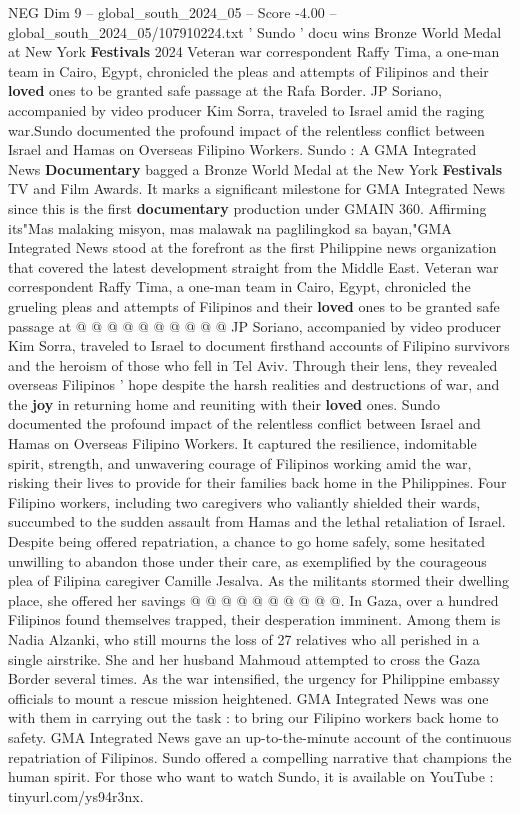 \begin{textsample}{NEG Dim 9 – global\_south\_2024\_05 – Score -4.00 – global\_south\_2024\_05/107910224.txt}  \label{ex:f9_neg_409}
' Sundo ' docu wins Bronze World Medal at New York \textbf{Festivals} 2024 Veteran war correspondent Raffy Tima, a one-man team in Cairo, Egypt, chronicled the pleas and attempts of Filipinos and their \textbf{loved} ones to be granted safe passage at the Rafa Border.
JP Soriano, accompanied by video producer Kim Sorra, traveled to Israel amid the raging war.Sundo documented the profound impact of the relentless conflict between Israel and Hamas on Overseas Filipino Workers.
Sundo : A GMA Integrated News \textbf{Documentary} bagged a Bronze World Medal at the New York \textbf{Festivals} TV and Film Awards.
It marks a significant milestone for GMA Integrated News since this is the first \textbf{documentary} production under GMAIN 360.
Affirming its"Mas malaking misyon, mas malawak na paglilingkod sa bayan,"GMA Integrated News stood at the forefront as the first Philippine news organization that covered the latest development straight from the Middle East.
Veteran war correspondent Raffy Tima, a one-man team in Cairo, Egypt, chronicled the grueling pleas and attempts of Filipinos and their \textbf{loved} ones to be granted safe passage at @ @ @ @ @ @ @ @ @ @ JP Soriano, accompanied by video producer Kim Sorra, traveled to Israel to document firsthand accounts of Filipino survivors and the heroism of those who fell in Tel Aviv.
Through their lens, they revealed overseas Filipinos ' hope despite the harsh realities and destructions of war, and the \textbf{joy} in returning home and reuniting with their \textbf{loved} ones.
Sundo documented the profound impact of the relentless conflict between Israel and Hamas on Overseas Filipino Workers.
It captured the resilience, indomitable spirit, strength, and unwavering courage of Filipinos working amid the war, risking their lives to provide for their families back home in the Philippines.
Four Filipino workers, including two caregivers who valiantly shielded their wards, succumbed to the sudden assault from Hamas and the lethal retaliation of Israel.
Despite being offered repatriation, a chance to go home safely, some hesitated unwilling to abandon those under their care, as exemplified by the courageous plea of Filipina caregiver Camille Jesalva.
As the militants stormed their dwelling place, she offered her savings @ @ @ @ @ @ @ @ @ @.
In Gaza, over a hundred Filipinos found themselves trapped, their desperation imminent.
Among them is Nadia Alzanki, who still mourns the loss of 27 relatives who all perished in a single airstrike.
She and her husband Mahmoud attempted to cross the Gaza Border several times.
As the war intensified, the urgency for Philippine embassy officials to mount a rescue mission heightened.
GMA Integrated News was one with them in carrying out the task : to bring our Filipino workers back home to safety.
GMA Integrated News gave an up-to-the-minute account of the continuous repatriation of Filipinos.
Sundo offered a compelling narrative that champions the human spirit.
For those who want to watch Sundo, it is available on YouTube : tinyurl.com/ys94r3nx.

\end{textsample}
